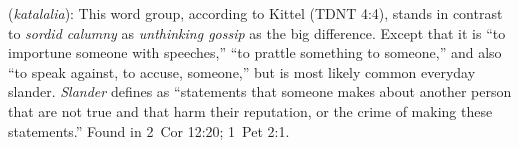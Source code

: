 \item[Slander,]

(\textit{katalalia}):
This word group, according to Kittel (TDNT 4:4), stands in contrast to \emph{sordid calumny} as \emph{unthinking gossip} as the big difference. Except that it is ``to importune someone with speeches,'' ``to prattle something to someone,'' and also ``to speak against, to accuse, someone,'' but is most likely common everyday slander. \emph{Slander} defines as ``statements that someone makes about another person that are not true and that harm their reputation, or the crime of making these statements.''
Found in 2~Cor 12:20; 1~Pet 2:1.
